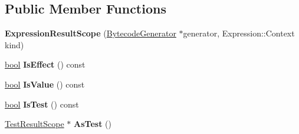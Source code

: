 \subsection*{Public Member Functions}
\begin{DoxyCompactItemize}
\item 
\mbox{\label{classv8_1_1internal_1_1interpreter_1_1BytecodeGenerator_1_1ExpressionResultScope_a51adfb3450cd39cefcaf26bcd4ffcf43}} 
{\bfseries Expression\+Result\+Scope} (\mbox{\hyperlink{classv8_1_1internal_1_1interpreter_1_1BytecodeGenerator}{Bytecode\+Generator}} $\ast$generator, Expression\+::\+Context kind)
\item 
\mbox{\label{classv8_1_1internal_1_1interpreter_1_1BytecodeGenerator_1_1ExpressionResultScope_a4cdc29b099d236c46a9a01e9794b08d0}} 
\mbox{\hyperlink{classbool}{bool}} {\bfseries Is\+Effect} () const
\item 
\mbox{\label{classv8_1_1internal_1_1interpreter_1_1BytecodeGenerator_1_1ExpressionResultScope_a15182816dd48cb3290a3659e5a0c7408}} 
\mbox{\hyperlink{classbool}{bool}} {\bfseries Is\+Value} () const
\item 
\mbox{\label{classv8_1_1internal_1_1interpreter_1_1BytecodeGenerator_1_1ExpressionResultScope_ad8027b31d6c0f6ebf0d8333a3e5e3d3b}} 
\mbox{\hyperlink{classbool}{bool}} {\bfseries Is\+Test} () const
\item 
\mbox{\label{classv8_1_1internal_1_1interpreter_1_1BytecodeGenerator_1_1ExpressionResultScope_a04fcaa45056f1729754e9c5deacb1e77}} 
\mbox{\hyperlink{classv8_1_1internal_1_1interpreter_1_1BytecodeGenerator_1_1TestResultScope}{Test\+Result\+Scope}} $\ast$ {\bfseries As\+Test} ()
\item 
\mbox{\label{classv8_1_1internal_1_1interpreter_1_1BytecodeGenerator_1_1ExpressionResultScope_a6c09741d534d8113f326acecdacc2056}} 

\end{DoxyCompactItemize}
